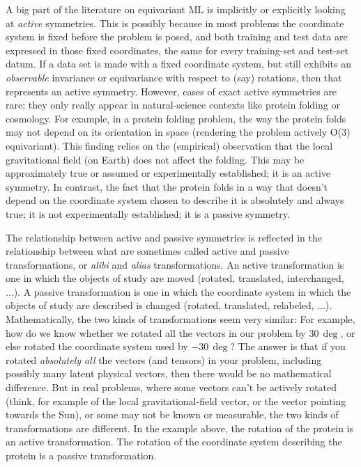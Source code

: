 \documentclass{article}
\theoremstyle{plain}
\theoremstyle{definition}
\theoremstyle{remark}
\begin{document}
A big part of the literature on equivariant ML is implicitly or explicitly looking at \emph{active} symmetries.
This is possibly because in most problems the coordinate system is fixed before the problem is posed, and both training and test data are expressed in those fixed coordinates, the same for every training-set and test-set datum.
If a data set is made with a fixed coordinate system, but still exhibits an {\em observable} invariance or equivariance with respect to (say) rotations, then that represents an active symmetry.
However, cases of exact active symmetries are rare; they only really appear in natural-science contexts like protein folding or cosmology.
For example, in a protein folding problem, the way the protein folds may not depend on its orientation in space (rendering the problem actively O(3) equivariant).
This finding relies on the (empirical) observation that the local gravitational field (on Earth) does not affect the folding.
This may be approximately true or assumed or experimentally established; it is an active symmetry.
In contrast, the fact that the protein folds in a way that doesn't depend on the coordinate system chosen to describe it is absolutely and always true; it is not experimentally established; it is a passive symmetry.

The relationship between active and passive symmetries is reflected in the relationship between what are sometimes called active and passive transformations, or \emph{alibi} and \emph{alias} transformations.
An active transformation is one in which the objects of study are moved (rotated, translated, interchanged, ...).
A passive transformation is one in which the coordinate system in which the objects of study are described is changed (rotated, translated, relabeled, ...).
Mathematically, the two kinds of transformations seem very similar:
For example, how do we know whether we rotated all the vectors in our problem by $30\,\deg$, or else rotated the coordinate system used by $-30\,\deg$?
The answer is that if you rotated \emph{absolutely all} the vectors (and tensors) in your problem, including possibly many latent physical vectors, then there would be no mathematical difference.
But in real problems, where some vectors can't be actively rotated (think, for example of the local gravitational-field vector, or the vector pointing towards the Sun), or some may not be known or measurable, the two kinds of transformations are different.
In the example above, the rotation of the protein is an active transformation.
The rotation of the coordinate system describing the protein is a passive transformation.
\end{document}
